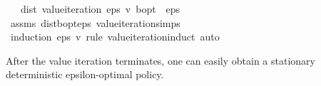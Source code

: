\begin{isabellebody}
\ \ \ {\isachardoublequoteopen}dist\ {\isacharparenleft}{\kern0pt}value{\isacharunderscore}{\kern0pt}iteration\ eps\ v{\isacharparenright}{\kern0pt}\ {\isasymnu}\isactrlsub b{\isacharunderscore}{\kern0pt}opt\ {\isacharless}{\kern0pt}\ eps\ {\isacharslash}{\kern0pt}\ {}{\isachardoublequoteclose}\isanewline
%
\isadelimproof
\ \ %
\endisadelimproof
%
\isatagproof
{}\isamarkupfalse%
\ assms\ dist{\isacharunderscore}{\kern0pt}{\isasymL}\isactrlsub b{\isacharunderscore}{\kern0pt}opt{\isacharunderscore}{\kern0pt}eps\ value{\isacharunderscore}{\kern0pt}iteration{\isachardot}{\kern0pt}simps\isanewline
\ \ \isamarkupfalse%
\ {\isacharparenleft}{\kern0pt}induction\ eps\ v\ rule{\isacharcolon}{\kern0pt}\ value{\isacharunderscore}{\kern0pt}iteration{\isachardot}{\kern0pt}induct{\isacharparenright}{\kern0pt}\ auto%
\endisatagproof
{\isafoldproof}%
%
\isadelimproof
%
\endisadelimproof
%
\begin{isamarkuptext}%
After the value iteration terminates, one can easily obtain a stationary deterministic 
epsilon-optimal policy.


\end{isamarkuptext}
\end{isabellebody}

